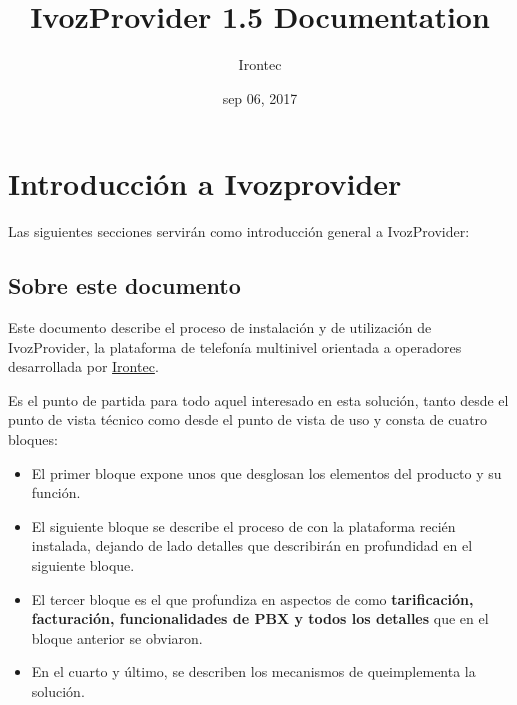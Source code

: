 \documentclass[letterpaper,10pt,spanish]{sphinxmanual}
\title{IvozProvider 1.5 Documentation}
\date{sep 06, 2017}
\author{Irontec}
\begin{document}
\maketitle
\tableofcontents
{}\label{index::doc}



\chapter{Introducción a Ivozprovider}
\label{intro/index::doc}\label{intro/index:introduction-to-ivozprovider}\label{intro/index:ivozprovider-official-documentation}
Las siguientes secciones servirán como introducción general a IvozProvider:


\section{Sobre este documento}
\label{intro/about:about-this-document}\label{intro/about::doc}
Este documento describe el proceso de instalación y de utilización de IvozProvider, la plataforma de telefonía multinivel orientada a operadores desarrollada por \href{http://irontec.com}{Irontec}.

Es el punto de partida para todo aquel interesado en esta solución, tanto desde el punto de vista técnico como desde el punto de vista de uso y consta de cuatro bloques:
\begin{itemize}
\item {} 
El primer bloque expone unos {\hyperref[index:concepts]{}} que desglosan los elementos del producto y su función.

\item {} 
El siguiente bloque se describe el proceso de {\hyperref[index:installation]{}} con la plataforma recién instalada, dejando de lado detalles que describirán en profundidad en el siguiente bloque.

\item {} 
El tercer bloque es el que profundiza en aspectos de {\hyperref[index:advanced]{}} como \textbf{tarificación, facturación, funcionalidades de PBX y todos los detalles} que en el bloque anterior se obviaron.

\item {} 
En el cuarto y último, se describen los mecanismos de {\hyperref[index:security]{}} queimplementa la solución.

\end{itemize}
\end{document}
